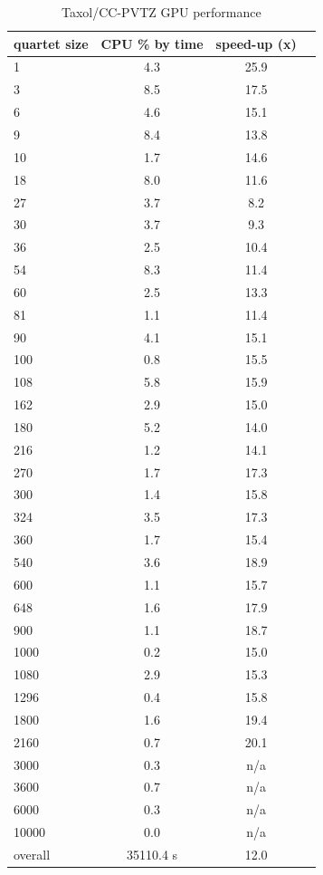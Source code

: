 \documentclass[12pt]{article}
\begin{document}
\begin{table}
  \label{results3}
  \caption {Taxol/CC-PVTZ GPU performance}
  \begin{center}
    \begin{tabular}{| l | c | c | c |}
      \hline
      quartet size & CPU \% by time  &  speed-up (x) \\
      \hline
      1 & 4.3 & 25.9 \\
      3 & 8.5 & 17.5 \\
      6 & 4.6 & 15.1 \\
      9 & 8.4 & 13.8 \\
      10 & 1.7 & 14.6 \\
      18 & 8.0 & 11.6 \\
      27 & 3.7 & 8.2 \\
      30 & 3.7 & 9.3 \\
      36 & 2.5 & 10.4 \\
      54 & 8.3 & 11.4 \\
      60 & 2.5 & 13.3 \\
      81 & 1.1 & 11.4 \\
      90 & 4.1 & 15.1 \\
      100 & 0.8 & 15.5 \\
      108 & 5.8 & 15.9 \\
      162 & 2.9 & 15.0 \\
      180 & 5.2 & 14.0 \\
      216 & 1.2 & 14.1 \\
      270 & 1.7 & 17.3 \\
      300 & 1.4 & 15.8 \\
      324 & 3.5 & 17.3 \\
      360 & 1.7 & 15.4 \\
      540 & 3.6 & 18.9 \\
      600 & 1.1 & 15.7 \\
      648 & 1.6 & 17.9 \\
      900 & 1.1 & 18.7 \\
      1000 & 0.2 & 15.0 \\
      1080 & 2.9 & 15.3 \\
      1296 & 0.4 & 15.8 \\
      1800 & 1.6 & 19.4 \\
      2160 & 0.7 & 20.1 \\
      3000 & 0.3 & n/a \\
      3600 & 0.7 & n/a \\
      6000 & 0.3 & n/a \\
      10000 & 0.0 & n/a \\
      \hline
      overall & 35110.4 s &  12.0 \\
      \hline
    \end{tabular}
  \end{center}
\end{table}
\end{document}
